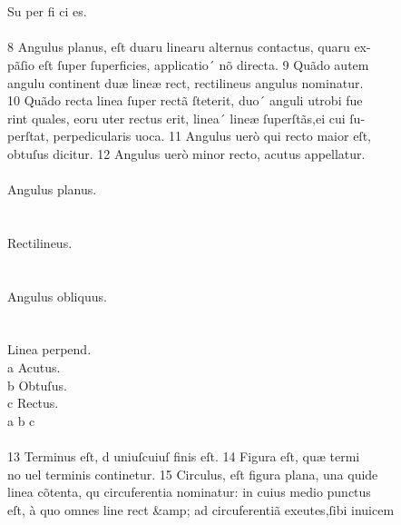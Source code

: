\begin{typeLatin}
\\
\\
Su per fi ci es.\\
\\
8 Angulus planus, eſt duar\bs\tld{}u linear\bs\tld{}u alternus contactus, quar\bs\tld{}u ex- \\
pãſio eſt ſuper ſuperficies, applicatio´ nõ directa. 9 Quãdo autem \\
angul\bs\tld{}u continent duæ lineæ rect, rectilineus angulus nominatur. \\
10 Quãdo recta linea ſuper rectã ſteterit, duo´ anguli utrobi fue \\
rint quales, eor\bs\tld{}u uter rectus erit, linea´ lineæ ſuperſtãs,\lwr ei cui ſu- \\
perſtat, perp\bs\tld{}edicularis uoca. 11 Angulus uerò qui recto maior eſt, \\
obtuſus dicitur. 12 Angulus uerò minor recto, acutus appellatur.\\
\\
Angulus planus.\\
\\
\\
Rectilineus.\\
\\
\\
Angulus obliquus.\\
\\
\\
Linea perpend.\\
a Acutus.\\
b Obtuſus.\\
c Rectus.\\
a b c\\
\\
13 Terminus eſt, d uniuſcuiuſ finis eſt. 14 Figura eſt, quæ termi \\
no uel terminis continetur. 15 Circulus, eſt figura plana, una quid\bs\tld{}e \\
linea cõtenta, qu circ\bs\tld{}uferentia nominatur: in cuius medio punctus \\
eſt, à quo omnes line rect &amp; ad circ\bs\tld{}uferentiã exe\bs\tld{}utes,\lwr ſibi inuicem
\end{typeLatin}

